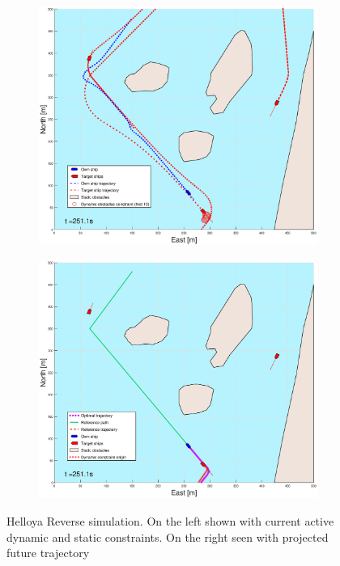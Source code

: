 \begin{figure}[ht]
\begin{subfigure}[b]{0.499\textwidth}
    \end{subfigure}
    \hfill
    \\
    \begin{subfigure}[b]{0.49\textwidth}
        \centering
        \includegraphics[width=\textwidth]{Images/Figures/Helloya_Rev/_Simple_0fig1_time=251}
    \end{subfigure}
    \hfill
    \begin{subfigure}[b]{0.499\textwidth}
        \centering
        \includegraphics[width=\textwidth]{Images/Figures/Helloya_Rev/_Simple_0fig999_time=251}
    \end{subfigure}
    \hfill
    \caption{Helloya Reverse simulation. On the left shown with current active dynamic and static constraints. On the right seen with projected future trajectory}
\end{figure}

